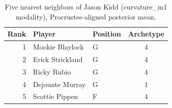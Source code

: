 \begin{table}[htbp]
  \centering\small
  \begin{tabular}{rllc}
    \toprule
    Rank & Player & Position & Archetype \\
    \midrule
    1 & Mookie Blaylock & G & 4 \\
    2 & Erick Strickland & G & 4 \\
    3 & Ricky Rubio & G & 4 \\
    4 & Dejounte Murray & G & 1 \\
    5 & Scottie Pippen & F & 4 \\
    \bottomrule
  \end{tabular}
  \caption{Five nearest neighbors of Jason Kidd (curvature_m1 modality), Procrustes-aligned posterior mean.}
  \label{tab:Jason_Kidd_neighbors_curvature_m1}
\end{table}


